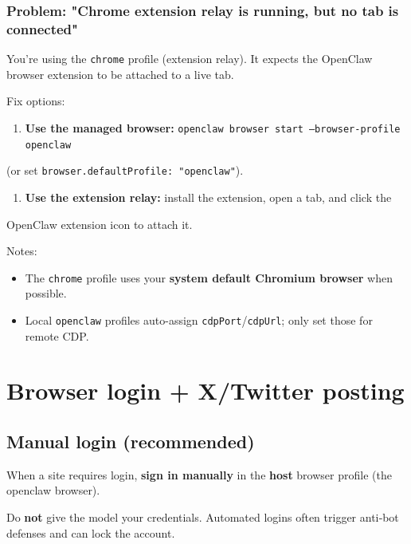 \subsubsection{Problem: "Chrome extension relay is running, but no tab is connected"}


You’re using the \texttt{chrome} profile (extension relay). It expects the OpenClaw
browser extension to be attached to a live tab.

Fix options:

\begin{enumerate}
  \item \textbf{Use the managed browser:} \texttt{openclaw browser start --browser-profile openclaw}
\end{enumerate}

(or set \texttt{browser.defaultProfile: "openclaw"}).
\begin{enumerate}
  \item \textbf{Use the extension relay:} install the extension, open a tab, and click the
\end{enumerate}

OpenClaw extension icon to attach it.

Notes:

\begin{itemize}
  \item The \texttt{chrome} profile uses your \textbf{system default Chromium browser} when possible.
  \item Local \texttt{openclaw} profiles auto-assign \texttt{cdpPort}/\texttt{cdpUrl}; only set those for remote CDP.
\end{itemize}



\clearpage

\section{Browser login + X/Twitter posting}


\subsection{Manual login (recommended)}


When a site requires login, \textbf{sign in manually} in the \textbf{host} browser profile (the openclaw browser).

Do \textbf{not} give the model your credentials. Automated logins often trigger anti‑bot defenses and can lock the account.

